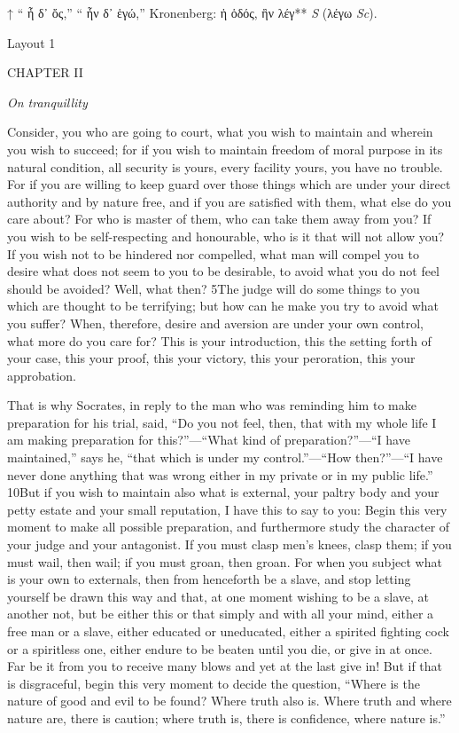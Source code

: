 

↑ `` ἦ δ᾽ ὄς,'' `` ἦν δ᾽ ἑγώ,'' Kronenberg: ἡ ὁδός, ἢν λέγ** \emph{S} (λέγω \emph{Sc}).


Layout 1

CHAPTER II

\emph{On tranquillity}

Consider, you who are going to court, what you wish to maintain and wherein you wish to succeed; for if you wish to maintain freedom of moral purpose in its natural condition, all security is yours, every facility yours, you have no trouble. For if you are willing to keep guard over those things which are under your direct authority and by nature free, and if you are satisfied with them, what else do you care about? For who is master of them, who can take them away from you? If you wish to be self-respecting and honourable, who is it that will not allow you? If you wish not to be hindered nor compelled, what man will compel you to desire what does not seem to you to be desirable, to avoid what you do not feel should be avoided? Well, what then? 5The judge will do some things to you which are thought to be terrifying; but how can he make you try to avoid what you suffer? When, therefore, desire and aversion are under your own control, what more do you care for? This is your introduction, this the setting forth of your case, this your proof, this your victory, this your peroration, this your approbation.

That is why Socrates, in reply to the man who was reminding him to make preparation for his trial, said, ``Do you not feel, then, that with my whole life I am making preparation for this?''—``What kind of preparation?''—``I have maintained,'' says he, ``that which is under my control.''—``How then?''—``I have never done anything that was wrong either in my private or in my public life.'' 10But if you wish to maintain also what is external, your paltry body and your petty estate and your small reputation, I have this to say to you: Begin this very moment to make all possible preparation, and furthermore study the character of your judge and your antagonist. If you must clasp men's knees, clasp them; if you must wail, then wail; if you must groan, then groan. For when you subject what is your own to externals, then from henceforth be a slave, and stop letting yourself be drawn this way and that, at one moment wishing to be a slave, at another not, but be either this or that simply and with all your mind, either a free man or a slave, either educated or uneducated, either a spirited fighting cock or a spiritless one, either endure to be beaten until you die, or give in at once. Far be it from you to receive many blows and yet at the last give in! But if that is disgraceful, begin this very moment to decide the question, ``Where is the nature of good and evil to be found? Where truth also is. Where truth and where nature are, there is caution; where truth is, there is confidence, where nature is.''

